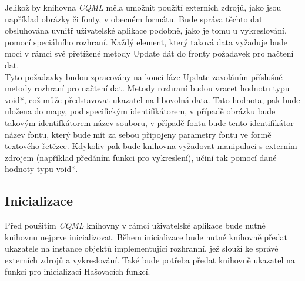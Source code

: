 \documentclass[11pt,twoside,a4paper]{book}
\begin{document}
{{\begin{ttemize}
{{Jelikož by knihovna \textit{CQML} měla umožnit použití externích zdrojů, jako jsou například obrázky či fonty, v obecném formátu. Bude správa těchto dat obsluhována uvnitř uživatelské aplikace podobně, jako je tomu u vykreslování, pomocí speciálního rozhraní. Každý element, který taková data vyžaduje bude moci v rámci své přetížené metody Update dát do fronty požadavek pro načtení dat.\\
Tyto požadavky budou zpracovány na konci fáze Update zavoláním příslušné metody rozhraní pro načtení dat. Metody rozhraní budou vracet hodnotu typu void*, což může představovat ukazatel na libovolná data. Tato hodnota, pak bude uložena do mapy, pod specifickým identifikátorem, v případě obrázku bude takovým identifkátorem název souboru, v případě fontu bude tento identifikátor název fontu, který bude mít za sebou připojeny parametry fontu ve formě textového řetězce. Kdykoliv pak bude knihovna vyžadovat manipulaci s externím zdrojem (například předáním funkci pro vykreslení), učiní tak pomocí dané hodnoty typu void*. \\

\subsection {Inicializace}
Před použitím \textit{CQML} knihovny v rámci uživatelské aplikace bude nutné knihovnu nejprve inicializovat. Během inicializace bude nutné knihovně předat ukazatele na instance objektů implementující rozhranní, jež slouží ke správě externích zdrojů a vykreslování. Také bude potřeba předat knihovně ukazatel na funkci pro inicializaci Hašovacích funkcí.\\




}}
\end{ttemize}}}
\end{document}
